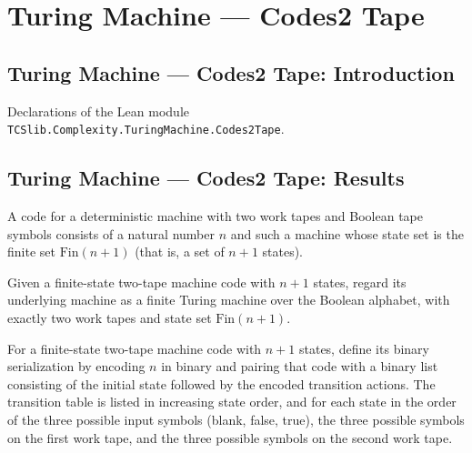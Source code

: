 \section{Turing Machine --- Codes2 Tape}
\subsection*{Turing Machine --- Codes2 Tape: Introduction}

Declarations of the Lean module \texttt{TCSlib.Complexity.TuringMachine.Codes2Tape}.

\subsection*{Turing Machine --- Codes2 Tape: Results}

\begin{definition}
\label{Turing.Code2TM}
\leanok
{}
A code for a deterministic machine with two work tapes and Boolean tape symbols consists
of a natural number $n$ and such a machine whose state set is the finite set
$\mathrm{Fin}(n+1)$ (that is, a set of $n+1$ states).
\end{definition}

\begin{definition}
\label{Turing.Code2TM.toFinTM}
\leanok
{}
Given a finite-state two-tape machine code with $n+1$ states, regard its underlying
machine as a finite Turing machine over the Boolean alphabet, with exactly two work
tapes and state set $\mathrm{Fin}(n+1)$.
\end{definition}

\begin{definition}
\label{Turing.Code2TM.serialize}
\leanok
{}
For a finite-state two-tape machine code with $n+1$ states, define its binary
serialization by encoding $n$ in binary and pairing that code with a binary list
consisting of the initial state followed by the encoded transition actions. The
transition table is listed in increasing state order, and for each state in the order of
the three possible input symbols (blank, false, true), the three possible symbols on the
first work tape, and the three possible symbols on the second work tape.
\end{definition}

